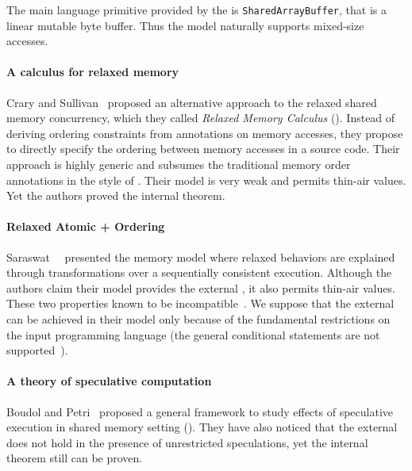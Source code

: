 The main language primitive provided by the \JSMM
is \texttt{SharedArrayBuffer}, that is a linear mutable byte buffer.
Thus the model naturally supports mixed-size accesses.

\paragraph{A calculus for relaxed memory}

Crary and Sullivan~\cite{Crary-Sullivan:POPL15} proposed 
an alternative approach to the relaxed shared memory concurrency,
which they called \emph{Relaxed Memory Calculus} (\RMC).
Instead of deriving ordering constraints from annotations 
on memory accesses, they propose to directly specify 
the ordering between memory accesses in a source code. 
Their approach is highly generic and subsumes 
the traditional memory order annotations in the style of \CMM.
Their model is very weak and permits thin-air values. 
Yet the authors proved the internal \DRF theorem.

\paragraph{Relaxed Atomic + Ordering}

Saraswat~\etal~\cite{Saraswat-al:PPoPP07} presented the \RAO memory model
where relaxed behaviors are explained through transformations 
over a sequentially consistent execution.
Although the authors claim their model provides the external \DRF,
it also permits thin-air values. 
These two properties known to be incompatible~\cite{Batty-al:ESOP15}.
We suppose that the external \DRF can be achieved in their model 
only because of the fundamental restrictions on the input programming language 
(\eg the general conditional statements are not supported~\cite{PichonPharabod-Sewell:POPL16}). 

\paragraph{A theory of speculative computation}

Boudol and Petri~\cite{Boudol-Petri:ESOP10} proposed a general 
framework to study effects of speculative execution in
shared memory setting (\TSC). 
They have also noticed that the external \DRF does not 
hold in the presence of unrestricted speculations, 
yet the internal \DRF theorem still can be proven. 
